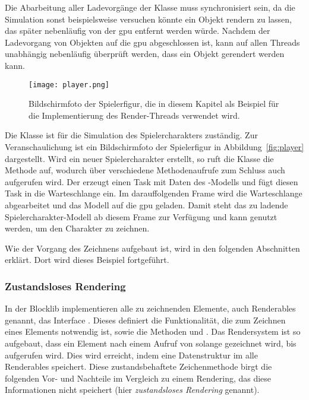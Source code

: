 Die Abarbeitung aller Ladevorgänge der Klasse \classLoader{} muss synchronisiert sein, da die Simulation sonst beispielsweise versuchen könnte ein Objekt rendern zu lassen, das später nebenläufig von der \ac{gpu} entfernt werden würde. Nachdem der Ladevorgang von Objekten auf die \ac{gpu} abgeschlossen ist, kann auf allen Threads unabhängig nebenläufig überprüft werden, dass ein Objekt gerendert werden kann.

\begin{figure}
	\centering
	\texttt{[image: player.png]}
	\caption[Bildschirmfoto der Spielerfigur in der Blocklib.]{Bildschirmfoto der Spielerfigur, die in diesem Kapitel als Beispiel für die Implementierung des Render-Threads verwendet wird.}\label{fig:player}
\end{figure}

\begin{example}
	Die Klasse \classPlayer{} ist für die Simulation des Spielercharakters zuständig. Zur Veranschaulichung ist ein Bildschirmfoto der Spielerfigur in Abbildung~\vref{fig:player} dargestellt. Wird ein neuer Spielercharakter erstellt, so ruft die Klasse \classPlayer{} die Methode  auf, wodurch über verschiedene Methodenaufrufe zum Schluss auch  aufgerufen wird. Der \classLoader{} erzeugt einen Task mit Daten des \classPlayer{}-Modells und fügt diesen Task in die Warteschlange ein. Im darauffolgenden Frame wird die Warteschlange abgearbeitet und das Modell auf die \ac{gpu} geladen. Damit steht das zu ladende Spielercharakter-Modell ab diesem Frame zur Verfügung und kann genutzt werden, um den Charakter zu zeichnen. 

	Wie der Vorgang des Zeichnens aufgebaut ist, wird in den folgenden Abschnitten erklärt. Dort wird dieses Beispiel fortgeführt.
\end{example}

\subsubsection{Zustandsloses Rendering}\label{sec:statelessRendering}
In der Blocklib implementieren alle zu zeichnenden Elemente, auch Renderables genannt, das Interface \classRenderable{}. Dieses definiert die Funktionalität, die zum Zeichnen eines Elements notwendig ist, sowie die Methoden  und . Das Rendersystem ist so aufgebaut, dass ein Element nach einem Aufruf von  solange gezeichnet wird, bis  aufgerufen wird. Dies wird erreicht, indem eine Datenstruktur im \classMasterRenderer{} alle Renderables speichert. Diese zustandsbehaftete Zeichenmethode birgt die folgenden Vor- und Nachteile im Vergleich zu einem Rendering, das diese Informationen nicht speichert (hier \emph{zustandsloses Rendering} genannt).

